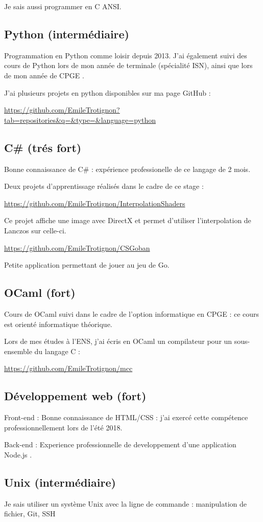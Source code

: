 \documentclass[10pt, a4paper, roman, french]{moderncv}
\begin{document}
	                Je sais aussi programmer en C ANSI.
	
		\subsection{Python (intermédiaire)}
			Programmation en Python comme loisir depuis 2013. J'ai également suivi des cours de Python lors de mon année de terminale (spécialité ISN), ainsi que lors de mon année de CPGE .
	
	                       J'ai plusieurs projets en python disponibles sur ma page GitHub :

                         \url{https://github.com/EmileTrotignon?tab=repositories&q=&type=&language=python}
	
		\subsection{C\# (trés fort)}
			Bonne connaissance de C\# : expérience professionelle de ce langage de 2 mois.

                         Deux projets d'apprentissage réalisés dans le cadre de ce stage :

                         \url{https://github.com/EmileTrotignon/InterpolationShaders}

Ce projet affiche une image avec DirectX et permet d'utiliser l'interpolation de Lanczos sur celle-ci.

\url{https://github.com/EmileTrotignon/CSGoban}

Petite application permettant de jouer au jeu de Go.
	
		\subsection{OCaml (fort)}
			Cours de OCaml suivi dans le cadre de l'option informatique en CPGE : ce cours est orienté informatique théorique.
                
                         Lors de mes études à l'ENS, j'ai écris en OCaml un compilateur pour un sous-ensemble du langage C :

                         \url{https://github.com/EmileTrotignon/mcc}
	
		\subsection{Développement web (fort)}
			Front-end : Bonne connaissance de HTML/CSS : j'ai exercé cette compétence professionnellement lors de l'été 2018.
	
	                       Back-end : Experience professionnelle de developpement d'une application Node.js .
	
		\subsection{Unix (intermédiaire)}
			Je sais utiliser un système Unix avec la ligne de commande : manipulation de fichier, Git, SSH 
	
\end{document}
